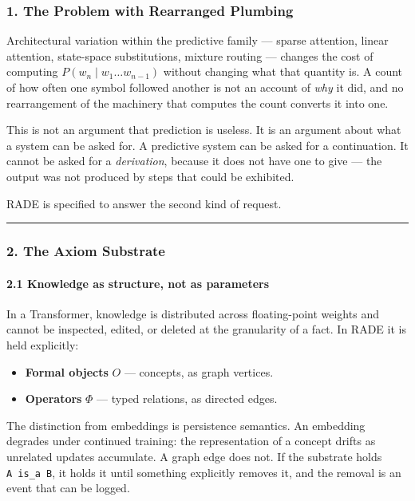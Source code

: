 \documentclass[
  11pt,
  a4paper,
]{article}
\providecommand{\tightlist}{%
  \setlength{\itemsep}{0pt}\setlength{\parskip}{0pt}}
\begin{document}
\subsubsection{1. The Problem with Rearranged
Plumbing}\label{the-problem-with-rearranged-plumbing}

Architectural variation within the predictive family --- sparse
attention, linear attention, state-space substitutions, mixture routing
--- changes the cost of computing \(P(w_n \mid w_1 \ldots w_{n-1})\)
without changing what that quantity is. A count of how often one symbol
followed another is not an account of \emph{why} it did, and no
rearrangement of the machinery that computes the count converts it into
one.

This is not an argument that prediction is useless. It is an argument
about what a system can be asked for. A predictive system can be asked
for a continuation. It cannot be asked for a \emph{derivation}, because
it does not have one to give --- the output was not produced by steps
that could be exhibited.

RADE is specified to answer the second kind of request.

\begin{center}\rule{0.5\linewidth}{0.5pt}\end{center}

\subsubsection{2. The Axiom Substrate}\label{the-axiom-substrate}

\paragraph{2.1 Knowledge as structure, not as
parameters}\label{knowledge-as-structure-not-as-parameters}

In a Transformer, knowledge is distributed across floating-point weights
and cannot be inspected, edited, or deleted at the granularity of a
fact. In RADE it is held explicitly:

\begin{itemize}
\tightlist
\item
  \textbf{Formal objects} \(O\) --- concepts, as graph vertices.
\item
  \textbf{Operators} \(\Phi\) --- typed relations, as directed edges.
\end{itemize}

The distinction from embeddings is persistence semantics. An embedding
degrades under continued training: the representation of a concept
drifts as unrelated updates accumulate. A graph edge does not. If the
substrate holds \texttt{A\ is\_a\ B}, it holds it until something
explicitly removes it, and the removal is an event that can be logged.
\end{document}
